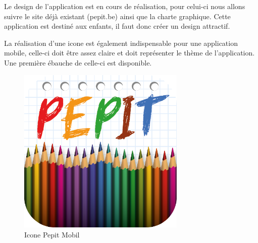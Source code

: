 Le design de l'application est en cours de réalisation, pour celui-ci nous allons suivre le site déjà existant (pepit.be) ainsi que la charte graphique. Cette application est destiné aux enfants, il faut donc créer un design attractif.


La réalisation d'une icone est également indispensable pour une application mobile, celle-ci doit \^{e}tre assez claire et doit représenter le thème de l'application. Une première ébauche de celle-ci est disponible.


\begin{figure}[H]
\begin{center}
\includegraphics[width=8cm]{images/icone}
\end{center}
\caption{Icone Pepit Mobil}
\label{Icone Pepit Mobil}
\end{figure}